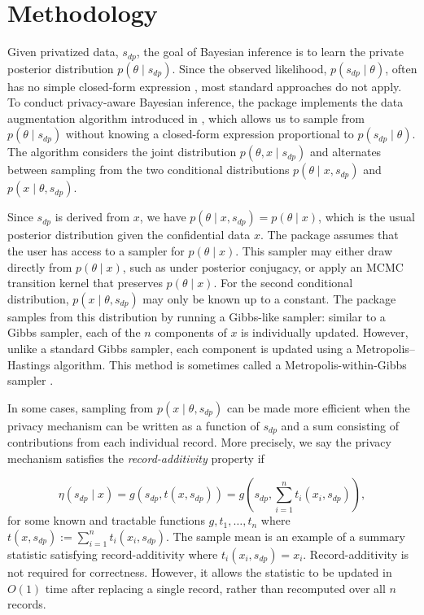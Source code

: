 \section{Methodology}\label{sec:methodology}

Given privatized data, \(s_{dp}\), the goal of Bayesian inference is to learn the
private posterior distribution \(p(\theta \mid s_{dp})\). Since the observed likelihood,
\(p(s_{dp} \mid \theta)\), often has no simple closed-form expression \citep{NIPS2010_sherry}, most standard approaches
do not apply. To conduct privacy-aware Bayesian inference, the  package implements
the data augmentation algorithm introduced in \citet{Ju2022}, which allows us to sample from \(p(\theta \mid s_{dp})\)
without knowing a closed-form expression proportional to \(p(s_{dp} \mid \theta)\).
The algorithm considers the joint distribution \(p(\theta, x \mid s_{dp})\) and
alternates between sampling from the two conditional distributions \(p(\theta \mid x, s_{dp})\)
and \(p(x \mid \theta, s_{dp})\).

Since \(s_{dp}\) is derived from \(x\), we have \(p(\theta \mid x, s_{dp}) = p(\theta \mid x)\), which
is the usual posterior distribution given the confidential data \(x\). The 
package assumes that the user has access to a sampler for \(p(\theta \mid x)\). This sampler
may either draw directly from \(p(\theta \mid x)\), such as under posterior conjugacy, or
apply an MCMC transition kernel that preserves \(p(\theta \mid x)\).
For the second conditional distribution, \(p(x \mid \theta, s_{dp})\) may
only be known up to a constant. The  package samples from this distribution by
running a Gibbs-like sampler: similar to a Gibbs sampler, each of the \(n\) components of \(x\) is individually
updated. However, unlike a standard Gibbs sampler, each component is updated
using a Metropolis--Hastings algorithm. This method is sometimes called a Metropolis-within-Gibbs sampler \citep{Robert2004}.

In some cases, sampling from \(p(x \mid \theta, s_{dp})\) can be made more efficient
when the privacy mechanism can be written as a function of \(s_{dp}\) and
a sum consisting of contributions from each individual record. More precisely, we say the privacy mechanism satisfies
the \emph{record-additivity} property if

\begin{equation*}
\eta(s_{dp} \mid x) = g\left(s_{dp}, t(x, s_{dp}) \right) = g\left(s_{dp}, \sum_{i=1}^{n}t_i(x_i, s_{dp}) \right),
\end{equation*}
for some known and tractable functions \(g, t_1, \ldots, t_n\) where \(t(x, s_{dp}) := \sum_{i=1}^{n} t_i(x_i, s_{dp})\).
The sample mean is an example of a summary statistic satisfying record-additivity where \(t_i(x_i, s_{dp}) = x_i\).
Record-additivity is not required for correctness. However, it allows the statistic to be updated in \(O(1)\) time after replacing a single record, rather than recomputed over all \(n\) records.

